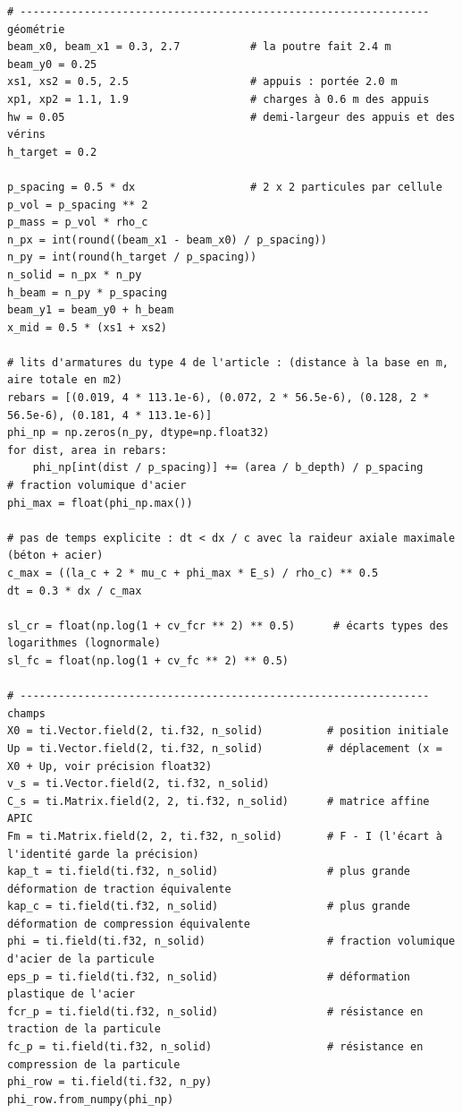 \documentclass[11pt,a4paper]{article}
\begin{document}
\begin{lstlisting}
# ---------------------------------------------------------------- géométrie
beam_x0, beam_x1 = 0.3, 2.7           # la poutre fait 2.4 m
beam_y0 = 0.25
xs1, xs2 = 0.5, 2.5                   # appuis : portée 2.0 m
xp1, xp2 = 1.1, 1.9                   # charges à 0.6 m des appuis
hw = 0.05                             # demi-largeur des appuis et des vérins
h_target = 0.2

p_spacing = 0.5 * dx                  # 2 x 2 particules par cellule
p_vol = p_spacing ** 2
p_mass = p_vol * rho_c
n_px = int(round((beam_x1 - beam_x0) / p_spacing))
n_py = int(round(h_target / p_spacing))
n_solid = n_px * n_py
h_beam = n_py * p_spacing
beam_y1 = beam_y0 + h_beam
x_mid = 0.5 * (xs1 + xs2)

# lits d'armatures du type 4 de l'article : (distance à la base en m, aire totale en m2)
rebars = [(0.019, 4 * 113.1e-6), (0.072, 2 * 56.5e-6), (0.128, 2 * 56.5e-6), (0.181, 4 * 113.1e-6)]
phi_np = np.zeros(n_py, dtype=np.float32)
for dist, area in rebars:
    phi_np[int(dist / p_spacing)] += (area / b_depth) / p_spacing      # fraction volumique d'acier
phi_max = float(phi_np.max())

# pas de temps explicite : dt < dx / c avec la raideur axiale maximale (béton + acier)
c_max = ((la_c + 2 * mu_c + phi_max * E_s) / rho_c) ** 0.5
dt = 0.3 * dx / c_max

sl_cr = float(np.log(1 + cv_fcr ** 2) ** 0.5)      # écarts types des logarithmes (lognormale)
sl_fc = float(np.log(1 + cv_fc ** 2) ** 0.5)

# ---------------------------------------------------------------- champs
X0 = ti.Vector.field(2, ti.f32, n_solid)          # position initiale
Up = ti.Vector.field(2, ti.f32, n_solid)          # déplacement (x = X0 + Up, voir précision float32)
v_s = ti.Vector.field(2, ti.f32, n_solid)
C_s = ti.Matrix.field(2, 2, ti.f32, n_solid)      # matrice affine APIC
Fm = ti.Matrix.field(2, 2, ti.f32, n_solid)       # F - I (l'écart à l'identité garde la précision)
kap_t = ti.field(ti.f32, n_solid)                 # plus grande déformation de traction équivalente
kap_c = ti.field(ti.f32, n_solid)                 # plus grande déformation de compression équivalente
phi = ti.field(ti.f32, n_solid)                   # fraction volumique d'acier de la particule
eps_p = ti.field(ti.f32, n_solid)                 # déformation plastique de l'acier
fcr_p = ti.field(ti.f32, n_solid)                 # résistance en traction de la particule
fc_p = ti.field(ti.f32, n_solid)                  # résistance en compression de la particule
phi_row = ti.field(ti.f32, n_py)
phi_row.from_numpy(phi_np)


\end{lstlisting}
\end{document}
